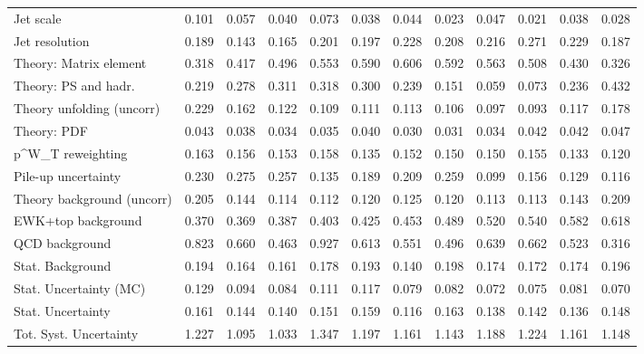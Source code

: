 \begin{tabular}{l|p{0.6cm}p{0.6cm}p{0.6cm}p{0.6cm}p{0.6cm}p{0.6cm}p{0.6cm}p{0.6cm}p{0.6cm}p{0.6cm}p{0.6cm}}
Jet scale                                & 0.101 & 0.057 & 0.040 & 0.073 & 0.038 & 0.044 & 0.023 & 0.047 & 0.021 & 0.038 & 0.028 \\
Jet resolution                           & 0.189 & 0.143 & 0.165 & 0.201 & 0.197 & 0.228 & 0.208 & 0.216 & 0.271 & 0.229 & 0.187 \\
Theory: Matrix element                   & 0.318 & 0.417 & 0.496 & 0.553 & 0.590 & 0.606 & 0.592 & 0.563 & 0.508 & 0.430 & 0.326 \\
Theory: PS and hadr.                     & 0.219 & 0.278 & 0.311 & 0.318 & 0.300 & 0.239 & 0.151 & 0.059 & 0.073 & 0.236 & 0.432 \\
Theory unfolding (uncorr)                & 0.229 & 0.162 & 0.122 & 0.109 & 0.111 & 0.113 & 0.106 & 0.097 & 0.093 & 0.117 & 0.178 \\
Theory: PDF                              & 0.043 & 0.038 & 0.034 & 0.035 & 0.040 & 0.030 & 0.031 & 0.034 & 0.042 & 0.042 & 0.047 \\
p^{W}_{T} reweighting                    & 0.163 & 0.156 & 0.153 & 0.158 & 0.135 & 0.152 & 0.150 & 0.150 & 0.155 & 0.133 & 0.120 \\
Pile-up uncertainty                      & 0.230 & 0.275 & 0.257 & 0.135 & 0.189 & 0.209 & 0.259 & 0.099 & 0.156 & 0.129 & 0.116 \\
Theory background (uncorr)               & 0.205 & 0.144 & 0.114 & 0.112 & 0.120 & 0.125 & 0.120 & 0.113 & 0.113 & 0.143 & 0.209 \\
EWK+top background                       & 0.370 & 0.369 & 0.387 & 0.403 & 0.425 & 0.453 & 0.489 & 0.520 & 0.540 & 0.582 & 0.618 \\
QCD background                           & 0.823 & 0.660 & 0.463 & 0.927 & 0.613 & 0.551 & 0.496 & 0.639 & 0.662 & 0.523 & 0.316 \\
Stat. Background                         & 0.194 & 0.164 & 0.161 & 0.178 & 0.193 & 0.140 & 0.198 & 0.174 & 0.172 & 0.174 & 0.196 \\
Stat. Uncertainty (MC)                   & 0.129 & 0.094 & 0.084 & 0.111 & 0.117 & 0.079 & 0.082 & 0.072 & 0.075 & 0.081 & 0.070 \\
\hline
Stat. Uncertainty                        & 0.161 & 0.144 & 0.140 & 0.151 & 0.159 & 0.116 & 0.163 & 0.138 & 0.142 & 0.136 & 0.148 \\
\hline
Tot. Syst. Uncertainty                   & 1.227 & 1.095 & 1.033 & 1.347 & 1.197 & 1.161 & 1.143 & 1.188 & 1.224 & 1.161 & 1.148 \\
\hline
\end{tabular}
